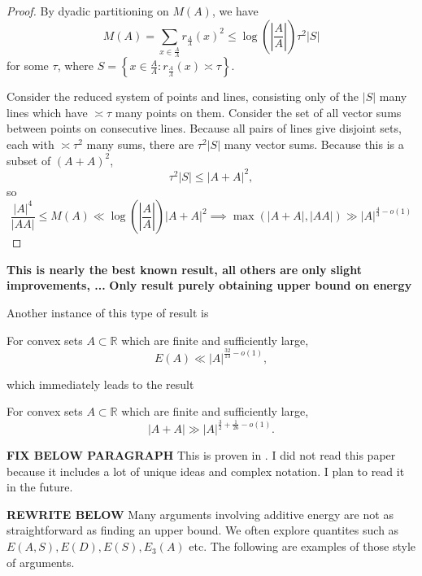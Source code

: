 \documentclass[12pt]{amsart}
\begin{document}
\begin{proof}
By dyadic partitioning on \(M(A)\), we have
\[
    M(A) = \sum _{x \in \frac{A}{A} } r_{\frac{A}{A} } (x)^{2} \leq  \log \left( \left\lvert \frac{A}{A} \right\rvert   \right) \tau ^{2} \left\lvert S \right\rvert
\]
for some \(\tau\), where \(S = \left\{ x \in \frac{A}{A}  : r_{\frac{A}{A} } (x) \asymp \tau \right\} \).

Consider the reduced system of points and lines, consisting only of the \(\left\lvert S \right\rvert \) many lines which
have \(\asymp \tau\) many points on them. Consider the set of all vector sums between points on
consecutive lines. Because all pairs of lines give disjoint sets, each with \(\asymp \tau ^{2}\) many sums, there are
\(\tau^{2}\left\lvert S \right\rvert \) many vector sums. Because this is a subset of \((A+A)^{2}\),
\[
    \tau^{2} \left\lvert S \right\rvert \leq \left\lvert A+A \right\rvert  ^{2}
,\]
so
\[
    \frac{\left\lvert A \right\rvert ^{4}}{\left\lvert AA\right\rvert } \leq M(A) \ll \log \left( \left\lvert \frac{A}{A} \right\rvert   \right)  \left\lvert A+A \right\rvert  ^{2} \implies \max \left( \left\lvert A+A \right\rvert ,\left\lvert AA \right\rvert  \right) \gg \left\lvert A \right\rvert ^{\frac{4}{3} - o(1)}
\]

\end{proof}

\textbf{This is nearly the best known result, all others are only slight improvements, ... }
\textbf{Only result purely obtaining upper bound on energy}

Another instance of this type of result is

\begin{theorem}
For convex sets \(A \subset \mathbb{R} \) which are finite and sufficiently large,
\[
    E(A) \ll \left\lvert A \right\rvert ^{\frac{32}{13} - o(1)}
,\]
\end{theorem}
which immediately leads to the result

\begin{corollary}
For convex sets \(A \subset \mathbb{R} \) which are finite and sufficiently large,
\[
    \left\lvert A+A \right\rvert \gg \left\lvert A \right\rvert ^{\frac{3}{2} + \frac{1}{26} - o(1)}
.\]
\end{corollary}

\textbf{FIX BELOW PARAGRAPH}
This is proven in \cite{shkredov-new-results-higher-energy}. I did not read this
paper because it includes a lot of unique ideas and complex notation. I plan to read it
in the future.

\textbf{REWRITE BELOW}
Many arguments involving additive energy are not as straightforward
as finding an upper bound. We often explore quantites such as \(E(A,S), E(D), E(S), E_{3} (A)\) etc.
The following are examples of those style of arguments.
\end{document}
